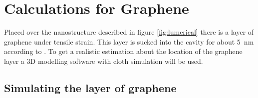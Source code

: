 \newpage
\section{Calculations for Graphene}

Placed over the nanostructure described in figure \ref{fig:lumerical} there is a layer of graphene under tensile strain. This layer is sucked into the cavity for about \SI{5}{nm} according to \cite{heeg}. To get a realistic estimation about the location of the graphene layer a 3D modelling software with cloth simulation will be used.

\subsection{Simulating the layer of graphene}

